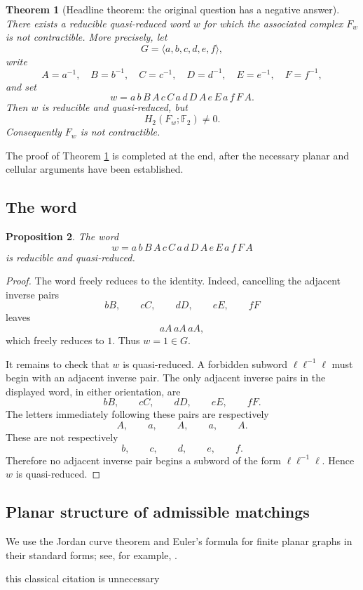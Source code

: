 \documentclass[12pt]{article}
\newcommand{\Ftwo}{\mathbb{F}_2}
\newtheorem{theorem}{Theorem}
\newtheorem{proposition}[theorem]{Proposition}
\theoremstyle{definition}
\newcommand{\review}[1]{\begin{reviewbox}#1\end{reviewbox}}
\begin{document}
\begin{theorem}[Headline theorem: the original question has a negative answer]\label{thm:headline}
There exists a reducible quasi-reduced word \(w\) for which the associated complex \(F_w\) is not contractible.  More precisely, let
\[
G=\langle a,b,c,d,e,f\rangle,
\]
write
\[
A=a^{-1},\quad B=b^{-1},\quad C=c^{-1},\quad
D=d^{-1},\quad E=e^{-1},\quad F=f^{-1},
\]
and set
\[
w=a\,b\,B\,A\,c\,C\,a\,d\,D\,A\,e\,E\,a\,f\,F\,A.
\]
Then \(w\) is reducible and quasi-reduced, but
\[
H_2(F_w;\Ftwo)\neq 0.
\]
Consequently \(F_w\) is not contractible.
\end{theorem}

The proof of Theorem \ref{thm:headline} is completed at the end, after the necessary planar and cellular arguments have been established.

\subsection{The word}

\begin{proposition}\label{prop:word}
The word
\[
w=a\,b\,B\,A\,c\,C\,a\,d\,D\,A\,e\,E\,a\,f\,F\,A
\]
is reducible and quasi-reduced.
\end{proposition}

\begin{proof}
The word freely reduces to the identity.  Indeed, cancelling the adjacent inverse pairs
\[
bB,\qquad cC,\qquad dD,\qquad eE,\qquad fF
\]
leaves
\[
aA\,aA\,aA,
\]
which freely reduces to \(1\).  Thus \(w=1\in G\).

It remains to check that \(w\) is quasi-reduced.  A forbidden subword \(\ell\ell^{-1}\ell\) must begin with an adjacent inverse pair.  The only adjacent inverse pairs in the displayed word, in either orientation, are
\[
bB,\qquad cC,\qquad dD,\qquad eE,\qquad fF.
\]
The letters immediately following these pairs are respectively
\[
A,\qquad a,\qquad A,\qquad a,\qquad A.
\]
These are not respectively
\[
b,\qquad c,\qquad d,\qquad e,\qquad f.
\]
Therefore no adjacent inverse pair begins a subword of the form \(\ell\ell^{-1}\ell\).  Hence \(w\) is quasi-reduced.
\end{proof}

\subsection{Planar structure of admissible matchings}

We use the Jordan curve theorem and Euler's formula for finite planar graphs in their standard forms; see, for example, \cite{Munkres}.\review{this classical citation is unnecessary}
\end{document}
